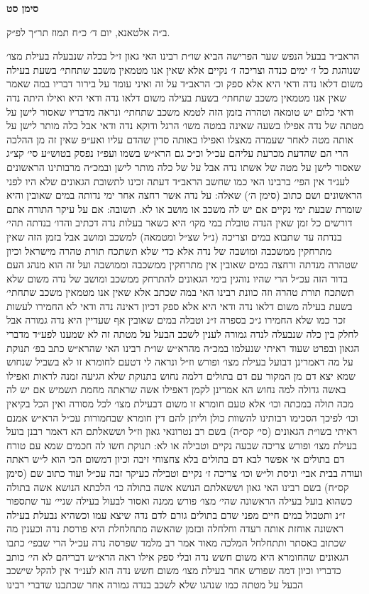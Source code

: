 \documentclass[12pt, openany]{book}
\newcommand{\chapname}{}
\newcommand{\newchap}[1]{
	\addcontentsline{toc}{chapter}{#1}
	\renewcommand{\chapname}{#1}
		\begin{center}
			\textbf{%
\fontsize{16pt}{16pt}\selectfont
				#1}
		\end{center}
}
\begin{document}
\newchap{סימן סט}
\begin{multicols}{2}
ב״ה אלטאנא, יום ד׳ כ״ח תמוז תר״ך לפ״ק.\\\vspace{0pt}

הראב״ד בבעל הנפש שער הפרישה הביא שו״ת רבינו האי גאון ז״ל בכלה שנבעלה בעילת מצו׳ שנוהגת כל ז׳ ימים כנדה וצריכה ז׳ נקיים אלא שאין אנו מטמאין משכב שתחתי׳ בשעת בעילה משום דלאו נדה ודאי היא אלא ספק וכ׳ הראב״ד על זה ואיני עומד על בירור דבריו במה שאמר שאין אנו מטמאין משכב שתחתי׳ בשעת בעילה משום דלאו נדה ודאי היא ואילו היתה נדה ודאי כלום יש טומאה וטהרה בזמן הזה לטמא משכב שתחתי׳ ונראה מדבריו שאסור לישן על מטתה של נדה אפילו בשעה שאינה במטה משו׳ הרגל ודוקא נדה ודאי אבל כלה מותר לישן על אותה מטה לאחר שעמדה מאצלו ואפילו באותה סדין שהדם עליו ואע״פ שאין זה מן ההלכה הרי הם שהדעת מכרעת עליהם עכ״ל וכ״כ גם הרא״ש בשמו ועפ״ז נפסק בטוש״ע סי׳ קצ״ג שאסור לישן על מטה של אשתו נדה אבל על של כלה מותר לישן ובמכ״ה מרבותינו הראשונים לענ״ד אין הפי׳ ברבינו האי כמו שחשב הראב״ד דעתה זכינו לתשובת הגאונים שלא היו לפני הראשונים ושם כתוב (סימן ה׳) שאלה: על נדה אשר רחצה אחר ימי נדותה במים שאובין והיא שומרת שבעת ימי נקיים אם יש לה משכב או מושב או לא. תשובה: אם על עיקר התורה אתם דורשים כל זמן שאין הנדה טובלת במי מקו׳ היא כשאר בעלות נדה דכתיב והדו׳ בנדתה תהי׳ בנדתה עד שתבוא במים וצריכה (נ״ל שצ״ל ומטמאה) למשכב ומושב אבל בזמן הזה שאין מתרחקין ממשכבה ומושבה של נדה אלא כדי שלא תשתכח תורת טהרה מישראל וכיון שטהרה מנדתה ורחצה במים שאובין אין מתרחקין ממשכבה וממושבה ועל זה הוא מנהג העם בדור הזה עכ״ל הרי שהיו נוהגין בימי הגאונים להתרחק ממשכב ומושב של נדה משום שלא תשתכח תורת טהרה וזה כוונת רבינו האי במה שכתב אלא שאין אנו מטמאין משכב שתחתי׳ בשעת בעילה משום דלאו נדה ודאי היא אלא ספק דכיון דאינה נדה ודאי לא החמירו לעשות זכר כמו שלא החמירו ג״כ בספרה ז״נ וטבלה במים שאובין אף שעדיין היא נדה גמורה אבל לחלק בין כלה שנבעלה לנדה גמורה לענין לשכב הבעל על מטתה זה לא שמענו לפע״ד מדברי הגאון ובפרט שעוד ראיתי שנעלמו במכ״ה מהרא״ש שו״ת רבינו האי שהרא״ש כתב בפ׳ תנוקת על מה דאמרינן דבועל בעילת מצו׳ ופורש וז״ל ונראה לי דטעם לחומרא זו לא בשביל שנחוש שמא יצא דם מן המקור עם דם בתולים דלמה נחוש בתנוקת שלא הגיעה זמנה לראות ואפילו באשה גדולה למה נחוש הא אמרינן לקמן דאפילו אשה שראתה מחמת תשמיש אם יש לה מכה תולה במכתה וכו׳ אלא טעם חומרא זו משום דבעילת מצו׳ לכל מסורה ואין הכל בקיאין וכו׳ לפיכך הסכימו רבותינו להשוות כולן וליתן להם דין חומרא שבחמורות עכ״ל הרא״ש אמנם ראיתי בשו״ת הגאונים (סי׳ קס״ה) בשם רב נטרונאי גאון וז״ל וששאלתם הא דאמר רבנן בועל בעילת מצו׳ ופורש צריכה שבעה נקיים וטבילה או לא: תנוקת חשו לה חכמים שמא עם טורח דם בתולים אי אפשר לבא דם בתולים בלא צחצוחי זיבה וכיון דמשום הכי הוא ל״ש ראתה ועודה בבית אבי׳ וניסת ול״ש וכו׳ צריכה ז׳ נקיים וטבילה כעיקר זבה עכ״ל ועוד כתוב שם (סימן קס״ח) בשם רבינו האי גאון וששאלתם הנושא אשה בתולה כו׳ הלכתא הנושא אשה בתולה כשהוא בועל בעילה הראשונה שהי׳ מצו׳ פורש ממנה ואסור לבעול בעילה שניי׳ עד שתספור ז״נ ותטבול במים חיים מפני שדם בתולים גורם לדם נדה שיצא עמו וכשהיא נבעלת בעילה ראשונה אוחזת אותה רעדה וחלחלה ובזמן שהאשה מתחלחלת היא פורסת נדה וכענין מה שכתוב באסתר ותתחלחל המלכה מאוד אמר רב מלמד שפרסה נדה עכ״ל הרי שבפי׳ כתבו הגאונים שהחומרא היא משום חשש נדה ובלי ספק אילו ראה הרא״ש דבריהם לא הי׳ כותב כדבריו וכיון דמה שפורש אחר בעילת מצו׳ משום חשש נדה הוא לענ״ד אין להקל שישכב הבעל על מטתה כמו שנהגו שלא לשכב בנדה גמורה אחר שכתבנו שדברי רבינו 
\end{multicols}
\end{document}
